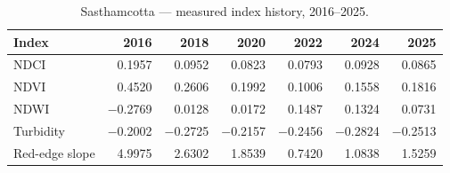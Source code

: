 \documentclass[12pt,a4paper,oneside]{report}
\begin{document}
\begin{table}[H]
\centering
\caption{Sasthamcotta --- measured index history, 2016--2025.}
\label{tab:sasthamcotta_hist}
\begin{tabular}{lrrrrrr}
\toprule
Index & 2016 & 2018 & 2020 & 2022 & 2024 & 2025 \\
\midrule
NDCI            & 0.1957 & 0.0952 & 0.0823 & 0.0793 & 0.0928 & 0.0865 \\
NDVI            & 0.4520 & 0.2606 & 0.1992 & 0.1006 & 0.1558 & 0.1816 \\
NDWI            & $-$0.2769 & 0.0128 & 0.0172 & 0.1487 & 0.1324 & 0.0731 \\
Turbidity       & $-$0.2002 & $-$0.2725 & $-$0.2157 & $-$0.2456 & $-$0.2824 & $-$0.2513 \\
Red-edge slope  & 4.9975 & 2.6302 & 1.8539 & 0.7420 & 1.0838 & 1.5259 \\
\bottomrule
\end{tabular}
\end{table}
\end{document}
